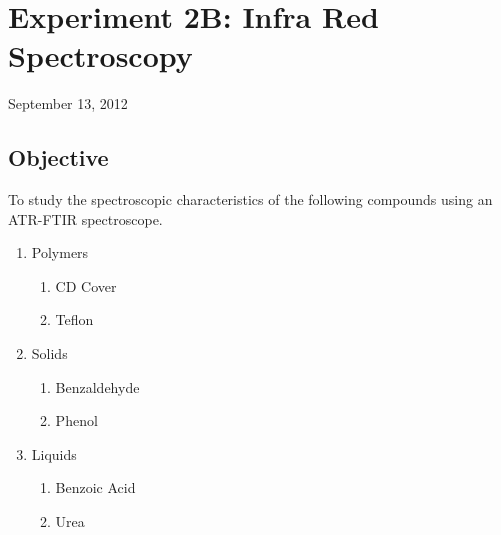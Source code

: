 \chapter{Experiment 2B: Infra Red Spectroscopy}
\begin{flushright}
September 13, 2012
\end{flushright}

\section{Objective}
	To study the spectroscopic characteristics of the following compounds using an ATR-FTIR spectroscope.
	\begin{enumerate}
		\item Polymers
		\begin{enumerate}
			\item CD Cover
			\item Teflon		
		\end{enumerate}
		\item Solids
		\begin{enumerate}
			\item Benzaldehyde
			\item Phenol
		\end{enumerate}
		\item Liquids
		\begin{enumerate}
			\item Benzoic Acid
			\item Urea
		\end{enumerate}
	\end{enumerate}

